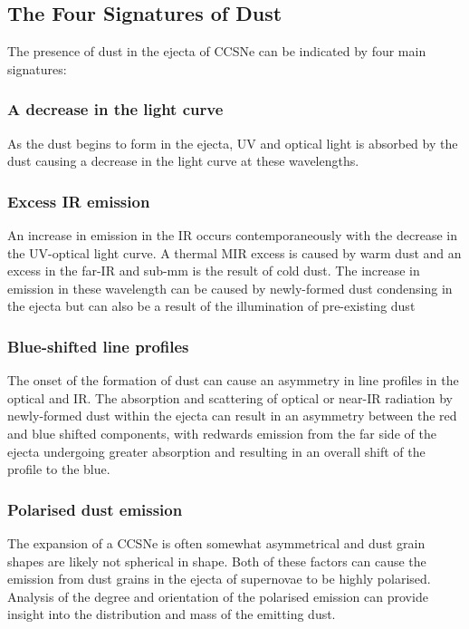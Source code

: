 
\subsection{The Four Signatures of Dust}
\label{three_sigs}


The presence of dust in the ejecta of CCSNe can be indicated by four main signatures: 

\subsubsection{A decrease in the light curve} 
As the dust begins to form in the ejecta, UV and optical light is absorbed by the dust causing a decrease in the light curve at these wavelengths.

\subsubsection{Excess IR emission}
An increase in emission in the IR occurs contemporaneously with the decrease in the UV-optical light curve.  A thermal MIR excess is caused by warm dust and an excess in the far-IR and sub-mm is the result of cold dust.  The increase in emission in these wavelength can be caused by newly-formed dust condensing in the ejecta but can also be a result of the illumination of pre-existing dust

\subsubsection{Blue-shifted line profiles}
The onset of the formation of dust can cause an asymmetry in line profiles in the optical and IR.  The absorption and scattering of optical or near-IR radiation by newly-formed dust within the ejecta can result in an asymmetry between the red and blue shifted components, with redwards 
emission from the far side of the ejecta undergoing greater absorption and resulting in an overall shift of the profile to the blue.

\subsubsection{Polarised dust emission}
The expansion of a CCSNe is often somewhat asymmetrical and dust grain shapes are likely not spherical in shape.  Both of these factors can cause the emission from dust grains in the ejecta of supernovae to be highly polarised.  Analysis of the degree and orientation of the polarised emission can provide insight into the distribution and mass of the emitting dust. 
\\

